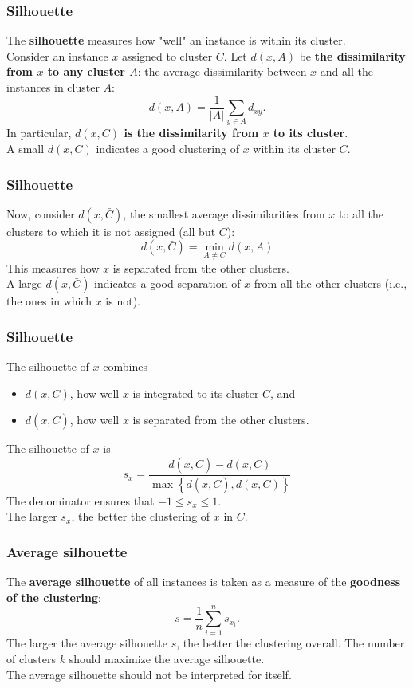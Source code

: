 \begin{frame}
\frametitle{Silhouette}
The {\bf silhouette} measures how "well" an instance is within its cluster. \\
\vspace{0.3cm}
Consider an instance $x$ assigned to cluster $C$. Let $d(x,A)$ be {\bf the dissimilarity from $x$ to any cluster $A$}: the average dissimilarity between $x$ and all the instances in cluster $A$:
$$
d(x,A) = \frac{1}{|A|} \sum_{y\in A} d_{xy}.
$$
In particular, {\bf $d(x, C)$ is the dissimilarity from $x$ to its cluster}.\\
\vspace{0.3cm}
A small $d(x,C)$ indicates a good clustering of $x$ within its cluster $C$.
\end{frame}
\begin{frame}
\frametitle{Silhouette}
Now, consider $d(x,\bar{C})$, the smallest average dissimilarities from $x$ to all the clusters to which it is not assigned (all but $C$):
$$
d(x,\bar{C}) = \min_{A\neq C} d(x, A)
$$
This measures how $x$ is separated from the other clusters.\\
\vspace{0.3cm}
A large $d(x,\bar{C})$ indicates a good separation of $x$ from all the other clusters (i.e., the ones in which $x$ is not).
\end{frame}
\begin{frame}
\frametitle{Silhouette}
The silhouette of $x$ combines
\begin{itemize}
\item $d(x, C)$, how well $x$ is integrated to its cluster $C$, and
\item $d(x,\bar{C})$, how well $x$ is separated from the other clusters.
\end{itemize}
The silhouette of $x$ is
$$
s_x=\frac{d(x,\bar{C})-d(x,C)}{\max\left\{d(x,\bar{C}),d(x,C)\right\}}
$$
The denominator ensures that $-1\leq s_x\leq 1$. \\
\vspace{0.3cm}
The larger $s_x$, the better the clustering of $x$ in $C$.
\end{frame}
\begin{frame}
\frametitle{Average silhouette}
The {\bf average silhouette} of all instances is taken as a measure of the {\bf goodness of the clustering}:
$$
s = \frac{1}{n}\sum_{i=1}^n s_{x_i}.
$$
The larger the average silhouette $s$, the better the clustering overall. The number of clusters $k$ should maximize the average silhouette.\\
\vspace{0.3cm}
The average silhouette should not be interpreted for itself.
\end{frame}
